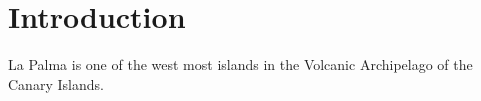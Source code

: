 \section{Introduction}

La Palma is one of the west most islands in the Volcanic Archipelago of the Canary Islands.
